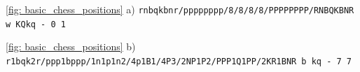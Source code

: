 \centerline{
    \ref{fig: basic_chess_positions} a) \lstset{basicstyle=\ttfamily}\lstinline{rnbqkbnr/pppppppp/8/8/8/8/PPPPPPPP/RNBQKBNR w KQkq - 0 1}
}
\centerline{
    \ref{fig: basic_chess_positions} b) \lstset{basicstyle=\ttfamily}\lstinline{r1bqk2r/ppp1bppp/1n1p1n2/4p1B1/4P3/2NP1P2/PPP1Q1PP/2KR1BNR b kq - 7 7}
}


